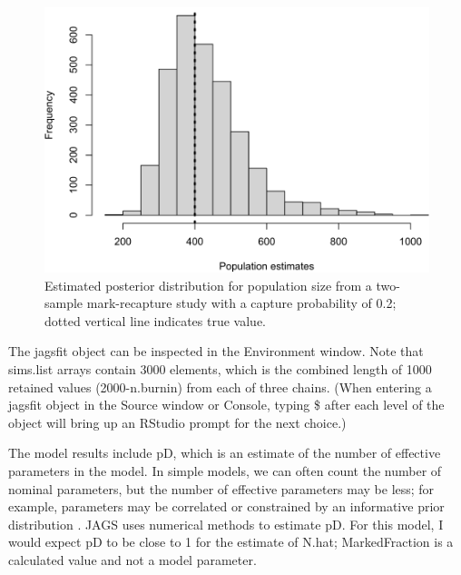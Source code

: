 \documentclass[
]{krantz}
\begin{document}
\begin{figure}
\includegraphics[width=0.9\linewidth]{bookdown_files/figure-latex/BayesMR-1} \caption{Estimated posterior distribution for population size from a two-sample mark-recapture study with a capture probability of 0.2; dotted vertical line indicates true value.}\label{fig:BayesMR}
\end{figure}

The jagsfit object can be inspected in the Environment window. Note that sims.list arrays contain 3000 elements, which is the combined length of 1000 retained values (2000-n.burnin) from each of three chains. (When entering a jagsfit object in the Source window or Console, typing \$ after each level of the object will bring up an RStudio prompt for the next choice.)

The model results include pD, which is an estimate of the number of effective parameters in the model. In simple models, we can often count the number of nominal parameters, but the number of effective parameters may be less; for example, parameters may be correlated or constrained by an informative prior distribution \citep{mccarthy_2007}. JAGS uses numerical methods to estimate pD. For this model, I would expect pD to be close to 1 for the estimate of N.hat; MarkedFraction is a calculated value and not a model parameter.
\end{document}
